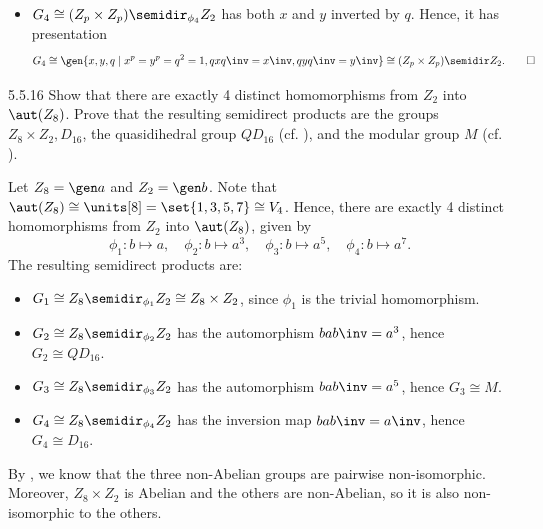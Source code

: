 \begin{sol}
\begin{itemize}
\begin{itemize}
	        We then have $\gen y \times \gen{q, x}$, where $\gen{q, x} \cong D_{2p}$.
	        Hence,
            \[
            	G_2 \cong Z_p \times D_{2p}.
            \]
            \item $G_4 \cong (Z_p \times Z_p) \semidir_{\phi_4} Z_2$ has both $x$ and $y$ inverted by $q$.
	        Hence, it has presentation
            \[
            	G_4 \cong \gen{x, y, q \mid x^p = y^p = q^2 = 1, qxq\inv = x\inv, qyq\inv = y\inv} \cong (Z_p \times Z_p) \semidir Z_2. \qedhere
            \]
        \end{itemize}
    \end{itemize}
\end{sol}

\begin{exercise}{5.5.16}
    Show that there are exactly 4 distinct homomorphisms from $Z_2$ into $\aut(Z_8)$.
	Prove that the resulting semidirect products are the groups $Z_8 \times Z_2, D_{16}$, the quasidihedral group $QD_{16}$ (cf. ), and the modular group $M$ (cf. ). 
\end{exercise}

\begin{sol}
    Let $Z_8 = \gen a$ and $Z_2 = \gen b$.
	Note that $\aut(Z_8) \cong \units[8] = \set{1, 3, 5, 7} \cong V_4$.
	Hence, there are exactly 4 distinct homomorphisms from $Z_2$ into $\aut(Z_8)$, given by
    \[
    	\phi_1 : b \mapsto a, \quad \phi_2 : b \mapsto a^3, \quad \phi_3 : b \mapsto a^5, \quad \phi_4 : b \mapsto a^7.
    \]
    The resulting semidirect products are:
    \begin{itemize}
        \item $G_1 \cong Z_8 \semidir_{\phi_1} Z_2 \cong Z_8 \times Z_2$, since $\phi_1$ is the trivial homomorphism.
        \item $G_2 \cong Z_8 \semidir_{\phi_2} Z_2$ has the automorphism $bab\inv = a^3$, hence $G_2 \cong QD_{16}$.
        \item $G_3 \cong Z_8 \semidir_{\phi_3} Z_2$ has the automorphism $bab\inv = a^5$, hence $G_3 \cong M$.
        \item $G_4 \cong Z_8 \semidir_{\phi_4} Z_2$ has the inversion map $bab\inv = a\inv$, hence $G_4 \cong D_{16}$.
    \end{itemize}
    By , we know that the three non-Abelian groups are pairwise non-isomorphic.
	Moreover, $Z_8 \times Z_2$ is Abelian and the others are non-Abelian, so it is also non-isomorphic to the others.
\end{sol}

